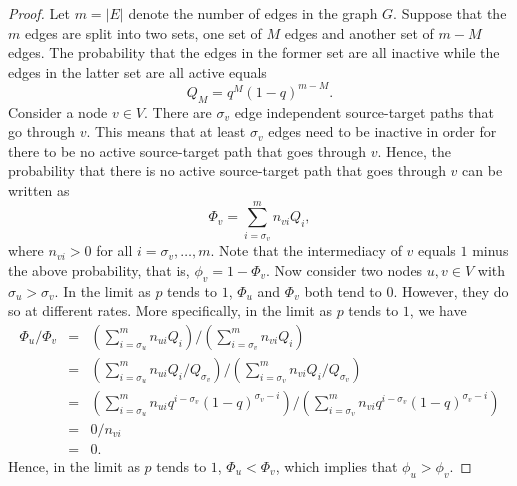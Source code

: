 \documentclass{article}
\theoremstyle{definition}
\begin{document}
\begin{proof}
	Let $m = |E|$ denote the number of edges in the graph $G$. Suppose that the $m$ edges are split into two sets, one set of $M$ edges and another set of $m-M$ edges. The probability that the edges in the former set are all inactive while the edges in the latter set are all active equals
	$$Q_M = q^M(1-q)^{m-M}.$$
	Consider a node $v \in V$. There are $\sigma_v$ edge independent source-target paths that go through $v$. This means that at least $\sigma_v$ edges need to be inactive in order for there to be no active source-target path that goes through $v$. Hence, the probability that there is no active source-target path that goes through $v$ can be written as
	$$\Phi_v = \sum_{i = \sigma_v}^m n_{vi} Q_i,$$
	where $n_{vi} > 0$ for all $i = \sigma_v,\dots,m$. Note that the intermediacy of $v$ equals $1$ minus the above probability, that is, $\phi_v = 1-\Phi_v$.
	Now consider two nodes $u, v \in V$ with $\sigma_u > \sigma_v$. In the limit as $p$ tends to $1$, $\Phi_u$ and $\Phi_v$ both tend to $0$. However, they do so at different rates. More specifically, in the limit as $p$ tends to $1$, we have
	\begin{eqnarray}
		\Phi_u / \Phi_v & = & \left(\sum_{i = \sigma_u}^m n_{ui} Q_i\right) / \left(\sum_{i = \sigma_v}^m n_{vi} Q_i\right) \nonumber\\
		& = & \left(\sum_{i = \sigma_u}^m n_{ui} Q_i / Q_{\sigma_v}\right) / \left(\sum_{i = \sigma_v}^m n_{vi} Q_i / Q_{\sigma_v}\right) \nonumber\\
		& = & \left(\sum_{i = \sigma_u}^m n_{ui} q^{i-\sigma_v} (1-q)^{\sigma_v-i}\right) / \left(\sum_{i = \sigma_v}^m n_{vi} q^{i-\sigma_v} (1-q)^{\sigma_v-i}\right) \nonumber\\
		& = & 0 / n_{vi} \nonumber\\
		& = & 0.
	\end{eqnarray}
	Hence, in the limit as $p$ tends to $1$, $\Phi_u < \Phi_v$, which implies that $\phi_u > \phi_v$.
\end{proof}
\end{document}
